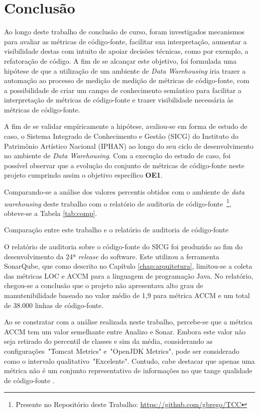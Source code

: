 \chapter{Conclusão}


Ao longo deste trabalho de conclusão de curso, foram investigados mecanismos para avaliar as métricas de código-fonte, facilitar sua interpretação, aumentar a visibilidade destas com intuito de apoiar decisões técnicas, como por exemplo, a refatoração de código. A fim de se alcançar este objetivo, foi formulada uma hipótese de que a utilização de um ambiente de \textit{Data Warehousing} iria trazer a automação ao processo de medição de medição de métricas de código-fonte, com a possibilidade de criar um campo de conhecimento semântico para facilitar a interpretação de métricas de código-fonte e trazer visibilidade necessária às métricas de código-fonte.


A fim de se validar empíricamente a hipótese, avaliou-se em forma de estudo de caso, o Sistema Integrado de Conhecimento e Gestão (SICG) do Instituto do Patrimônio Artístico Nacional (IPHAN) ao longo do seu ciclo de desenvolvimento no ambiente de \textit{Data Warehousing}. Com a execução do estudo de caso, foi possível observar que a evolução do conjunto de métricas de código-fonte neste projeto cumprindo assim o objetivo específico \textbf{OE1}.

Comparando-se a análise dos valores percentis obtidos com o ambiente de \textit{data warehousing} deste trabalho com o relatório de auditoria de código-fonte~\footnote{Presente no Repositório deste Trabalho: \url{https://github.com/gbrego/TCC}}, obteve-se a Tabela \ref{tab:comp}.

\begin{table}[!ht]
\centering

\caption{Comparação entre este trabalho e o relatório de auditoria de código-fonte}
\label{tab:comp}
\end{table}
\FloatBarrier

O relatório de auditoria sobre o código-fonte do SICG foi produzido ao fim do desenvolvimento da 24ª \textit{release} do software. Este utilizou a ferramenta SonarQube, que como descrito no Capítulo \ref{chap:arquitetura}, limitou-se a coleta das métricas LOC e ACCM para a linguagem de programação Java. No relatório, chegou-se a conclusão que o projeto não apresentava alto grau de manutenibilidade baseado no valor médio de 1,9 para métrica ACCM e um total de 38.000 linhas de código-fonte. 

Ao se constratar com a análise realizada neste trabalho, percebe-se que a métrica ACCM tem um valor semelhante entre Analizo e Sonar. Embora este valor não seja retirado do percentil de classes e sim da média, considerando as configurações~"Tomcat Metrics" e~"OpenJDK Metrics", pode ser considerado como o intervalo qualitativo~"Excelente". Contudo, cabe destacar que apenas uma métrica não é um conjunto representativo de informações no que tange qualidade de código-fonte \cite{Meirelles2013}.



